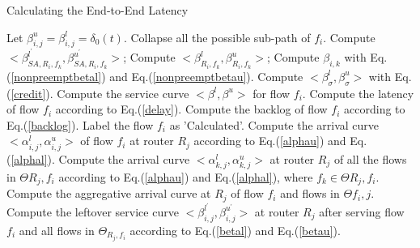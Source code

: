 \documentclass[10pt,journal]{IEEEtran}
\begin{document}
\begin{algorithm}
\caption{Calculating the End-to-End Latency}
\label{alg:equivalentservicecurve}
\begin{algorithmic}[1]
            \STATE Let $\beta_{i,j}^u=\beta_{i,j}^l=\delta_0(t)$.
        \ENDFOR
    \ENDFOR
        \STATE Collapse all the possible sub-path of $f_i$.
                \STATE Compute $<\beta_{SA,R_i,f_k}^{l^\prime},\beta_{SA,R_i,f_k}^{u^\prime}>$;
                \STATE Compute $<\beta_{R_i,f_k}^l,\beta_{R_i,f_k}^u>$;
                \ENDFOR
            \ENDIF
                \STATE Compute $\beta_{i,k}$ with Eq.(\ref{nonpreemptbetal}) and Eq.(\ref{nonpreemptbetau}).
            \ENDIF
        \ENDFOR
        \STATE Compute $<\beta_\sigma^l,\beta_\sigma^u>$ with Eq.(\ref{credit}).
        \STATE Compute the service curve $<\beta^l,\beta^u>$ for flow $f_i$.
        \STATE Compute the latency of flow $f_i$ according to Eq.(\ref{delay}).
        \STATE Compute the backlog of flow $f_i$ according to Eq.(\ref{backlog}).
        \STATE Label the flow $f_i$ as 'Calculated'.
                \STATE Compute the arrival curve $<\alpha^l_{i,j},\alpha^u_{i,j}>$ of flow $f_i$ at router $R_j$ according to Eq.(\ref{alphau}) and Eq.(\ref{alphal}).
                \STATE Compute the arrival curve $<\alpha^l_{k,j},\alpha^u_{k,j}>$ at router $R_j$ of all the flows in $\Theta{R_j,f_i}$ according to Eq.(\ref{alphau}) and Eq.(\ref{alphal}), where $f_k\in\Theta{R_j,f_i}$.
                \STATE Compute the aggregative arrival curve at $R_j$ of  flow $f_i$ and flows in $\Theta{f_i,j}$.
                \STATE Compute the leftover service curve $<\beta^{l^\prime}_{i,j},\beta^{u^\prime}_{i,j}>$ at router $R_j$ after serving flow $f_i$ and all flows in $\Theta_{R_j,f_i}$ according to Eq.(\ref{betal}) and Eq.(\ref{betau}).
            \ENDIF
        \ENDFOR
    \ENDFOR
\end{algorithmic}
\end{algorithm}
\end{document}
